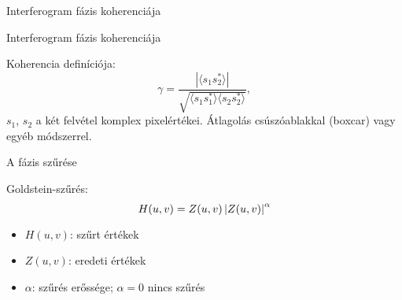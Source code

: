 \def\ft{Interferogram fázis koherenciája}

\begin{frame}{\ft}
    \begin{minic}{0.75}
    \end{minic}
\end{frame}


\begin{frame}{\ft}
    \begin{minipage}[c]{0.5\textwidth}
    \end{minipage}
    \hspace{10pt}
    \begin{minipage}[c]{0.4\textwidth}
    Koherencia definíciója:
    $$ \gamma = \frac{|\langle s_1 s_2^* \rangle|}{\sqrt{\langle s_1 s_1^*
        \rangle \langle s_2 s_2^* \rangle}}, $$
    $s_1$, $s_2$ a két felvétel komplex pixelértékei. Átlagolás csúszóablakkal (boxcar) vagy egyéb módszerrel.
    \end{minipage}
\end{frame}


\def\ft{A fázis szűrése}

\begin{frame}{\ft}
    \begin{minipage}[c]{0.5\textwidth}
    \end{minipage}
    \hspace{10pt}
    \begin{minipage}[c]{0.4\textwidth}
    Goldstein-szűrés:
    \[
        H(u,v) = Z(u,v) \left|Z(u,v)\right|^{\alpha}
    \]
    \begin{itemize}
        \item $H(u,v)$: szűrt értékek
        \item $Z(u,v)$: eredeti értékek
        \item $\alpha$: szűrés erőssége; $\alpha = 0$ nincs szűrés
    \end{itemize}
    \end{minipage}
\end{frame}
